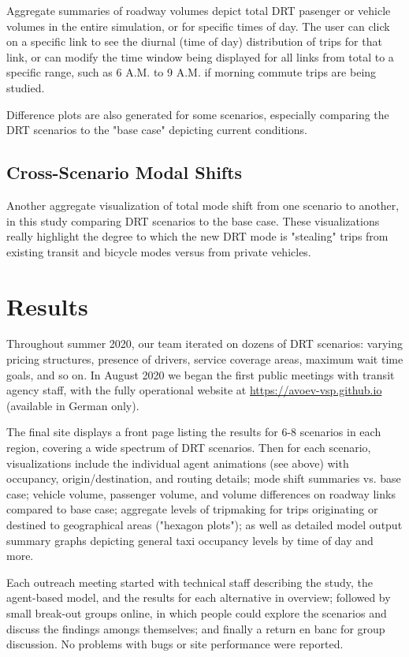 \documentclass[3p,times,procedia]{elsarticle}
\begin{document}
Aggregate summaries of roadway volumes depict total DRT pasenger or vehicle volumes in the entire simulation, or for specific times of day. The user can click on a specific link to see the diurnal (time of day) distribution of trips for that link, or can modify the time window being displayed for all links from total to a specific range, such as 6 A.M. to 9 A.M. if morning commute trips are being studied.

Difference plots are also generated for some scenarios, especially comparing the DRT scenarios to the "base case" depicting current conditions.

\subsection{Cross-Scenario Modal Shifts}

Another aggregate visualization of total mode shift from one scenario to another, in this study comparing DRT scenarios to the base case. These visualizations really highlight the degree to which the new DRT mode is "stealing" trips from existing transit and bicycle modes versus from private vehicles.


\section{Results}
\label{results}

Throughout summer 2020, our team iterated on dozens of DRT scenarios: varying pricing structures, presence of drivers, service coverage areas, maximum wait time goals, and so on. In August 2020 we began the first public meetings with transit agency staff, with the fully operational website at \url{https://avoev-vsp.github.io} (available in German only).

The final site displays a front page listing the results for 6-8 scenarios in each region, covering a wide spectrum of DRT scenarios. Then for each scenario, visualizations include the individual agent animations (see above) with occupancy, origin/destination, and routing details; mode shift summaries vs. base case; vehicle volume, passenger volume, and volume differences on roadway links compared to base case; aggregate levels of tripmaking for trips originating or destined to geographical areas ("hexagon plots"); as well as detailed model output summary graphs depicting general taxi occupancy levels by time of day and more.

Each outreach meeting started with technical staff describing the study, the agent-based model, and the results for each alternative in overview; followed by small break-out groups online, in which people could explore the scenarios and discuss the findings amongs themselves; and finally a return en banc for group discussion. No problems with bugs or site performance were reported.
\end{document}
